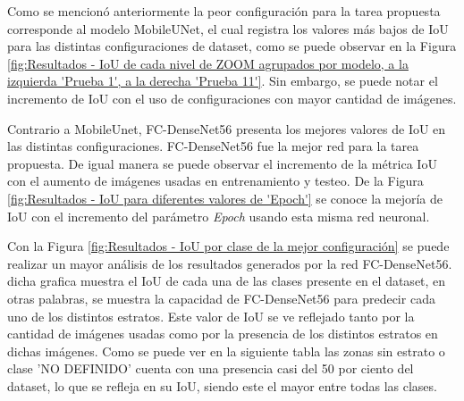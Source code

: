 
Como se mencionó anteriormente la peor configuración para la tarea propuesta corresponde al modelo MobileUNet, el cual registra los valores más bajos de IoU para las distintas configuraciones de dataset, como se puede observar en la Figura  \ref{fig:Resultados - IoU de cada nivel de ZOOM agrupados por modelo, a la izquierda 'Prueba 1', a la derecha 'Prueba 11'}. Sin embargo, se puede notar el incremento de IoU con el uso de configuraciones con mayor cantidad de imágenes. 


Contrario a MobileUnet, FC-DenseNet56 presenta los mejores valores de IoU en las distintas configuraciones. FC-DenseNet56 fue la mejor red para la tarea propuesta. De igual manera se puede observar el incremento de la métrica IoU con el aumento de imágenes usadas en entrenamiento y testeo. De la Figura \ref{fig:Resultados - IoU para diferentes valores de 'Epoch'} se conoce la mejoría de IoU con el incremento del parámetro \textit{Epoch} usando esta misma red neuronal. 


Con la Figura \ref{fig:Resultados - IoU por clase de la mejor configuración} se puede realizar un mayor análisis de los resultados generados por la red FC-DenseNet56. dicha grafica muestra el IoU de cada una de las clases presente en el dataset, en otras palabras, se muestra la capacidad de FC-DenseNet56 para predecir cada uno de los distintos estratos. Este valor de IoU se ve reflejado tanto por la cantidad de imágenes usadas como por la presencia de los distintos estratos en dichas imágenes. Como se puede ver en la siguiente tabla las zonas sin estrato o clase 'NO DEFINIDO' cuenta con una presencia casi del 50 por ciento del dataset, lo que se refleja en su IoU, siendo este el mayor entre todas las clases. 



